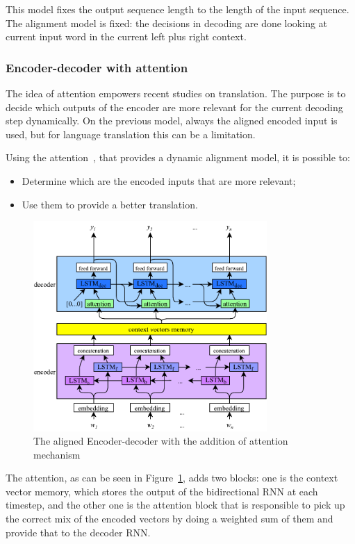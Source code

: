 This model fixes the output sequence length to the length of the input sequence. The alignment model is fixed: the decisions in decoding are done looking at current input word in the current left plus right context.

\subsubsection{Encoder-decoder with attention}
\label{sequenceAttention}

The idea of attention empowers recent studies on translation. The purpose is to decide which outputs of the encoder are more relevant for the current decoding step dynamically. On the previous model, always the aligned encoded input is used, but for language translation this can be a limitation.

Using the attention~\cite{bahdanau2014neural}, that provides a dynamic alignment model, it is possible to:

\begin{itemize}
	\item Determine which are the encoded inputs that are more relevant;

	\item Use them to provide a better translation.
\end{itemize}

\begin{figure}[!htbp]
    \centering
    \includegraphics[max width=\linewidth,max height=8cm,keepaspectratio]{figures/encoderDecoderAttention}
    \caption{The aligned Encoder-decoder with the addition of attention mechanism}\label{fig:encoderDecoderAttention}
\end{figure}

The attention, as can be seen in Figure~\ref{fig:encoderDecoderAttention}, adds two blocks: one is the context vector memory, which stores the output of the bidirectional RNN at each timestep, and the other one is the attention block that is responsible to pick up the correct mix of the encoded vectors by doing a weighted sum of them and provide that to the decoder RNN. 

